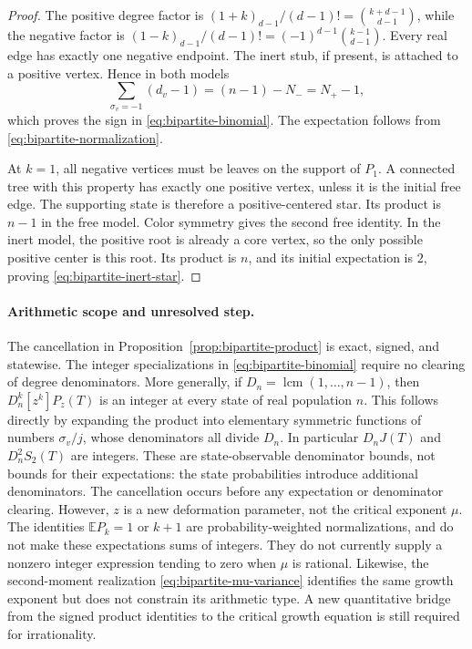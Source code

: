 \begin{proof}
The positive degree factor is
$(1+k)_{d-1}/(d-1)!={k+d-1\choose d-1}$, while the negative factor is
$(1-k)_{d-1}/(d-1)!=(-1)^{d-1}{k-1\choose d-1}$.
Every real edge has exactly one negative endpoint.  The inert stub, if
present, is attached to a positive vertex.  Hence in both models
\[
 \sum_{\sigma_v=-1}(d_v-1)=(n-1)-N_-=N_+-1,
\]
which proves the sign in \eqref{eq:bipartite-binomial}.  The expectation
follows from \eqref{eq:bipartite-normalization}.

At $k=1$, all negative vertices must be leaves on the support of $P_1$.
A connected tree with this property has exactly one positive vertex,
unless it is the initial free edge.  The supporting state is therefore
a positive-centered star.  Its product is $n-1$ in the free model.
Color symmetry gives the second free identity.  In the inert model,
the positive root is already a core vertex, so the only possible
positive center is this root.  Its product is $n$, and its initial
expectation is $2$, proving \eqref{eq:bipartite-inert-star}.
\end{proof}



\paragraph{Arithmetic scope and unresolved step.}
The cancellation in Proposition~\ref{prop:bipartite-product} is exact,
signed, and statewise.  The integer specializations in
\eqref{eq:bipartite-binomial} require no clearing of degree denominators.
More generally, if $D_n=\operatorname{lcm}(1,\ldots,n-1)$, then
$D_n^k[z^k]P_z(T)$ is an integer at every state of real population $n$.
This follows directly by expanding the product into elementary
symmetric functions of numbers $\sigma_v/j$, whose denominators all
divide $D_n$.  In particular $D_nJ(T)$ and $D_n^2S_2(T)$ are integers.
These are state-observable denominator bounds, not bounds for their
expectations: the state probabilities introduce additional denominators.
The cancellation occurs before any expectation or denominator clearing.  However,
$z$ is a new deformation parameter, not the critical exponent $\mu$.
The identities $\mathbb EP_k=1$ or $k+1$ are probability-weighted
normalizations, and do not make these expectations sums of integers.
They do not currently supply a nonzero integer expression tending to
zero when $\mu$ is rational.  Likewise, the second-moment realization
\eqref{eq:bipartite-mu-variance} identifies the same growth exponent but
does not constrain its arithmetic type.  A new quantitative bridge
from the signed product identities to the critical growth equation is
still required for irrationality.


